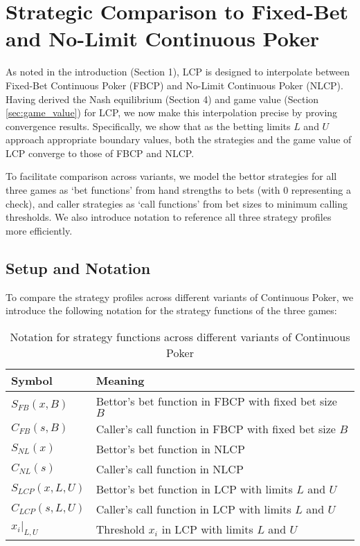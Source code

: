 \documentclass[../../main/main.tex]{subfiles}
\begin{document}
\section{Strategic Comparison to Fixed-Bet and No-Limit Continuous Poker}
\label{sec:strategic_comparison}

As noted in the introduction (Section 1), LCP is designed to interpolate between Fixed-Bet Continuous Poker (FBCP) and No-Limit Continuous Poker (NLCP). Having derived the Nash equilibrium (Section 4) and game value (Section \ref{sec:game_value}) for LCP, we now make this interpolation precise by proving convergence results. Specifically, we show that as the betting limits $L$ and $U$ approach appropriate boundary values, both the strategies and the game value of LCP converge to those of FBCP and NLCP.

To facilitate comparison across variants, we model the bettor strategies for all three games as `bet functions' from hand strengths to bets (with 0 representing a check), and caller strategies as `call functions' from bet sizes to minimum calling thresholds. We also introduce notation to reference all three strategy profiles more efficiently.

\subsection{Setup and Notation}

To compare the strategy profiles across different variants of Continuous Poker, we introduce the following notation for the strategy functions of the three games:

\begin{table}[h]
\centering
\begin{tabular}{|l|l|}
\hline
\textbf{Symbol} & \textbf{Meaning} \\
\hline
$S_{FB}(x, B)$ & Bettor's bet function in FBCP with fixed bet size $B$ \\
$C_{FB}(s, B)$ & Caller's call function in FBCP with fixed bet size $B$ \\
$S_{NL}(x)$ & Bettor's bet function in NLCP \\
$C_{NL}(s)$ & Caller's call function in NLCP \\
$S_{LCP}(x, L, U)$ & Bettor's bet function in LCP with limits $L$ and $U$ \\
$C_{LCP}(s, L, U)$ & Caller's call function in LCP with limits $L$ and $U$ \\
$x_i|_{L,U}$ & Threshold $x_i$ in LCP with limits $L$ and $U$ \\
\hline
\end{tabular}
\caption{Notation for strategy functions across different variants of Continuous Poker}
\label{tab:notation}
\end{table}
\end{document}
